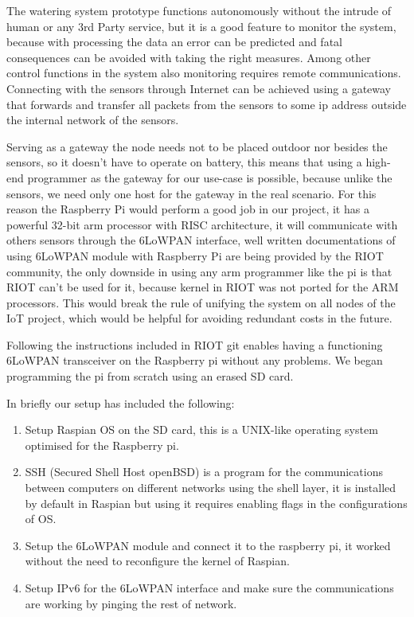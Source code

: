 \documentclass[11pt,paper=a4,parskip=half]{scrartcl}
\begin{document}
The watering system prototype functions autonomously without the intrude of
human or any 3rd Party service, but it is a good feature to monitor the system,
because with processing the data an error can be predicted and fatal
consequences can be avoided with taking the right measures. Among other control
functions in the system also monitoring requires remote communications.
Connecting with the sensors through Internet can be achieved using a gateway
that forwards and transfer all packets from the sensors to some ip address
outside the internal network of the sensors.

Serving as a gateway the node
needs not to be placed outdoor nor besides the sensors, so it doesn't have to
operate on battery, this means that using a high-end programmer as the gateway
for our use-case is possible, because unlike the sensors, we need only one host
for the gateway in the real scenario. For this reason the Raspberry Pi would
perform a good job in our project, it has a powerful 32-bit arm processor with
RISC architecture, it will communicate with others sensors through the 6LoWPAN
interface, well written documentations of using 6LoWPAN module with Raspberry Pi
are being provided by the RIOT community, the only downside in using any arm
programmer like the pi is that RIOT can't be used for it, because kernel in
RIOT was not ported for the ARM processors. This would break the rule of
unifying the system on all nodes of the IoT project, which would be helpful for
avoiding redundant costs in the future.

Following the instructions included in RIOT git \cite{riot_lowpan} enables having
a functioning 6LoWPAN transceiver on the Raspberry pi without any problems. We
began programming the pi from scratch using an erased SD card.

In briefly our setup has included the following:
\begin{enumerate}
	\item Setup Raspian OS on the SD card, this is a UNIX-like operating system optimised for the Raspberry pi.
	\item SSH (Secured Shell Host  openBSD) is a program for the communications between computers on different networks using the shell layer, it is installed by default in Raspian but using it requires enabling flags in the configurations of OS.
	\item Setup the 6LoWPAN module and connect it to the raspberry pi, it worked without the need to reconfigure the kernel of Raspian.
	\item Setup IPv6 for the 6LoWPAN interface and make sure the communications are working by pinging the rest of network.
\end{enumerate}
\end{document}
